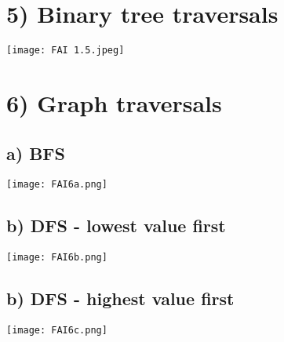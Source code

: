 \documentclass[12pt]{scrartcl}
\begin{document}
\section*{5) Binary tree traversals}
    \texttt{[image: FAI 1.5.jpeg]}

\section*{6) Graph traversals}
    \subsection*{a) BFS}
    \texttt{[image: FAI6a.png]}

    \subsection*{b) DFS - lowest value first}
    \texttt{[image: FAI6b.png]}

    \subsection*{b) DFS - highest value first}
    \texttt{[image: FAI6c.png]}
\end{document}
